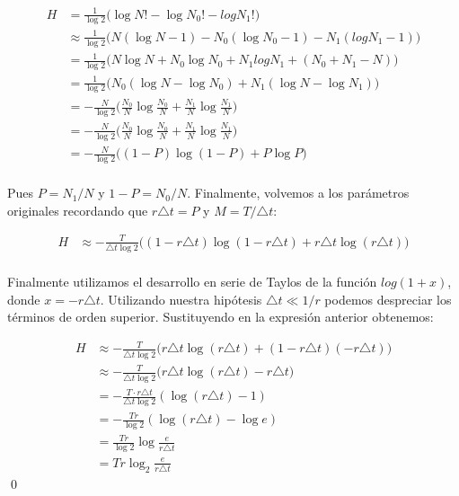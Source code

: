 \documentclass[11pt]{article}
\theoremstyle{plain}
\begin{document}
\[
	\begin{align*}
		H & = \frac{1}{\log 2} \bigg( \log N! - \log N_0! - log N_1! \bigg) \\
		& \approx \frac{1}{\log 2} \bigg( N (\log N - 1) - N_0 (\log N_0 - 1) - N_1 (log N_1 - 1) \bigg) \\
		& = \frac{1}{\log 2} \bigg( N \log N + N_0 \log N_0  + N_1 log N_1 + (N_0 + N_1 - N) \bigg) \\
		& = \frac{1}{\log 2} \bigg( N_0 (\log N - \log N_0) + N_1 (\log N - \log N_1) \bigg) \\
		& = - \frac{N}{\log 2} \bigg( \frac{N_0}{N} \log \frac{N_0}{N} + \frac{N_1}{N} \log \frac{N_1}{N} \bigg) \\
		& = - \frac{N}{\log 2} \bigg( \frac{N_0}{N} \log \frac{N_0}{N} + \frac{N_1}{N} \log \frac{N_1}{N} \bigg) \\
		& = - \frac{N}{\log 2} \bigg( (1-P) \log (1-P) + P \log P \bigg) \\
	\end{align*}	
\]

Pues $P = N_1/N$ y $1 - P = N_0/N$. Finalmente, volvemos a los parámetros originales recordando que $r \triangle t = P$ y $M = T / \triangle t$:

\[
	\begin{align*}
		H & \approx - \frac{T}{\triangle t \log 2} \bigg( (1 - r\triangle t) \log (1 - r\triangle t) + r\triangle t \log (r\triangle t) \bigg) \\
	\end{align*}	
\]

Finalmente utilizamos el desarrollo en serie de Taylos de la función $log(1 + x)$, donde $x = -r\triangle t$. Utilizando nuestra hipótesis $\triangle t \ll 1/r$ podemos despreciar los términos de orden superior. Sustituyendo en la expresión anterior obtenemos:

\[
	\begin{align*}
		H & \approx - \frac{T}{\triangle t \log 2} \bigg( r\triangle t \log (r\triangle t) + (1 - r\triangle t) (- r\triangle t) \bigg) \\
		& \approx - \frac{T}{\triangle t \log 2} \bigg( r\triangle t \log (r\triangle t) - r\triangle t \bigg) \\
		& = - \frac{T \cdot r\triangle t}{\triangle t \log 2} (\log (r\triangle t) - 1) \\
		& = - \frac{Tr}{\log 2} (\log (r\triangle t) - \log e) \\
		& = \frac{Tr}{\log 2} \log \frac{e}{r\triangle t} \\
		& = Tr \log_2 \frac{e}{r\triangle t}
	\end{align*}
\]
\qed
\end{document}
